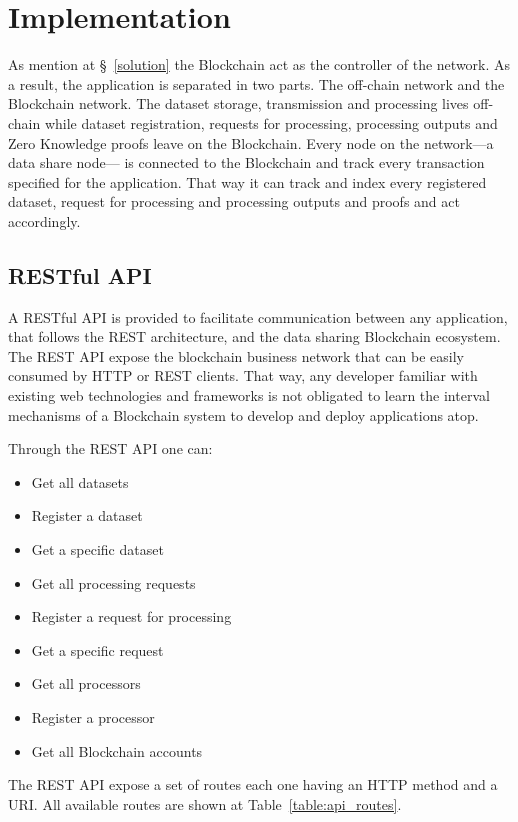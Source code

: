 \chapter{Implementation}
\label{implemenation}

As mention at §~\ref{solution} the Blockchain act as the controller of the network. As a result, the application is separated in two parts. The off-chain network and the Blockchain network. The dataset storage, transmission and processing lives off-chain while dataset registration, requests for processing, processing outputs and Zero Knowledge proofs leave on the Blockchain. Every node on the network---a data share node--- is connected to the Blockchain and track every transaction specified for the application. That way it can track and index every registered dataset, request for processing and processing outputs and proofs and act accordingly.

\section{RESTful API}
\label{implemenation:rest}

A RESTful API is provided to facilitate communication between any application, that follows the REST architecture, and the data sharing Blockchain ecosystem. The REST API expose the blockchain business network that can be easily consumed by HTTP or REST clients. That way, any developer familiar with existing web technologies and frameworks is not obligated to learn the interval mechanisms of a Blockchain system to develop and deploy applications atop.

Through the REST API one can:

\begin{itemize}
  \item Get all datasets
  \item Register a dataset
  \item Get a specific dataset
  \item Get all processing requests
  \item Register a request for processing
  \item Get a specific request
  \item Get all processors
  \item Register a processor
  \item Get all Blockchain accounts
\end{itemize}

The REST API expose a set of routes each one having an HTTP method and a URI. All available routes are shown at Table~\ref{table:api_routes}.

